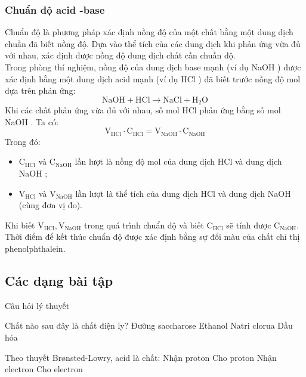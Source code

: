 \subsubsection{Chuẩn độ acid -base}
Chuẩn độ là phương pháp xác định nồng độ của một chất bằng một dung dịch chuần đã biết nồng độ. Dựa vào thể tích của các dung dịch khi phản ứng vừa đủ với nhau, xác định được nồng độ dung dịch chất cần chuần độ.
\\
Trong phòng thí nghiệm, nồng độ của dung dịch base mạnh (ví dụ NaOH ) được xác định bằng một dung dịch acid mạnh (ví dụ HCl ) đã biết trước nồng độ mol dựa trên phản ứng:
\[
\mathrm{NaOH}+\mathrm{HCl} \longrightarrow \mathrm{NaCl}+\mathrm{H}_2 \mathrm{O}
\]
Khi các chất phản ứng vừa đủ với nhau, số mol HCl phản ứng bằng số mol NaOH .
Ta có:
\[
\mathrm{V}_{\mathrm{HCl}} \cdot \mathrm{C}_{\mathrm{HCl}}=\mathrm{V}_{\mathrm{NaOH}} \cdot \mathrm{C}_{\mathrm{NaOH}}
\]
Trong đó:
	\begin{itemize}
		\item $\mathrm{C}_{\mathrm{HCl}}$ và $\mathrm{C}_{\mathrm{NaOH}}$ lần lượt là nồng độ mol của dung dịch HCl và dung dịch NaOH ;
		\item $\mathrm{V}_{\mathrm{HCl}}$ và $\mathrm{V}_{\mathrm{NaOH}}$ lần lượt là thể tích của dung dịch HCl và dung dịch NaOH (cùng đơn vị đo).
	\end{itemize}
Khi biết $\mathrm{V}_{\mathrm{HCl}}, \mathrm{V}_{\mathrm{NaOH}}$ trong quá trình chuẩn độ và biết $\mathrm{C}_{\mathrm{HCl}}$ sẽ tính được $\mathrm{C}_{\mathrm{NaOH}}$.\\
Thời điểm để kết thúc chuẩn độ được xác định bằng sự đổi màu của chất chỉ thị phenolphthalein.
\subsection{Các dạng bài tập}
\begin{dang}{Câu hỏi lý thuyết}
\end{dang}
\begin{vd}
	Chất nào sau đây là chất điện ly?
	\choice
	{Đường saccharose}
	{Ethanol}
	{\True Natri clorua}
	{Dầu hỏa}
\end{vd}
\begin{vd}
	Theo thuyết Brønsted-Lowry, acid là chất:
	\choice
	{Nhận proton}
	{\True Cho proton}
	{Nhận electron}
	{Cho electron}
\end{vd}

